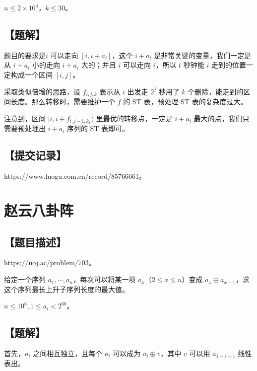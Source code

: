 \documentclass[UTF8,12pt,a4paper]{ctexart}
\begin{document}
	$n\leq 2\times 10^4$，$k\leq 30$。
	
	\subsection*{【题解】}
	
	题目的要求是$i$ 可以走向 $[i,i+a_i]$，这个 $i+a_i$ 是非常关键的变量，我们一定是从 $i+a_i$ 小的走向 $i+a_i$ 大的；并且 $i$ 可以走向 $i$，所以 $t$ 秒钟能 $i$ 走到的位置一定构成一个区间 $[i,j]$。
	
	采取类似倍增的思路，设 $f_{i,j,k}$ 表示从 $i$ 出发走 $2^j$ 秒用了 $k$ 个删除，能走到的区间长度。那么转移时，需要维护一个 $f$ 的 ST 表，预处理 ST 表的复杂度过大。
	
	注意到，区间 $[i,i+f_{i,j-1,k_1})$ 里最优的转移点，一定是 $i+a_i$ 最大的点，我们只需要预处理出 $i+a_i$ 序列的 ST 表即可。	
	
	\subsection*{【提交记录】}
	
	https://www.luogu.com.cn/record/85766661。
	
	
	\section*{赵云八卦阵}
	
	\subsection*{【题目描述】}
	
	https://uoj.ac/problem/703。
	
	给定一个序列 $a_1,\cdots,a_n$，每次可以将某一项 $a_x$（$2\le x\le n$）变成 $a_x\oplus a_{x−1}$，求这个序列最长上升子序列长度的最大值。
	
	$n\le 10^6,1\le a_i<2^{60}$。
	
	\subsection*{【题解】}
	
	首先，$a_i$ 之间相互独立，且每个 $a_i$ 可以成为 $a_i\oplus v$，其中 $v$ 可以用 $a_{1\sim i-1}$ 线性表出。
	
\end{document}
